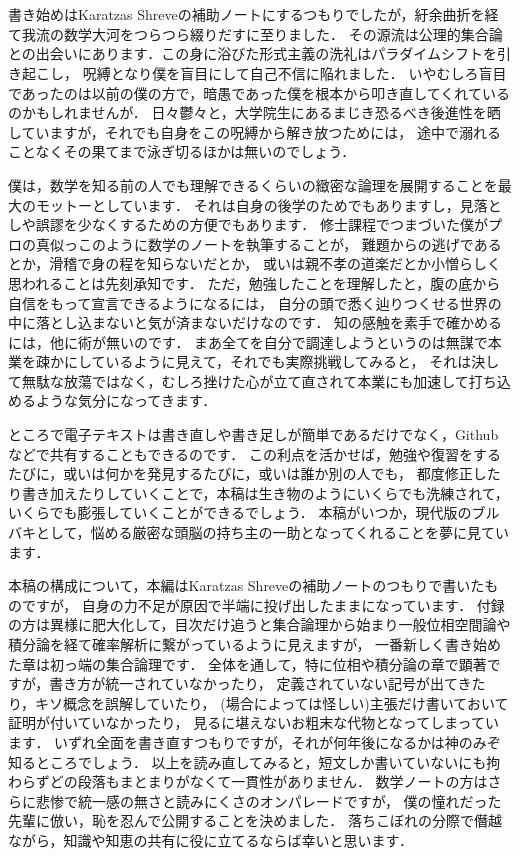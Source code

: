 \chapter*{}
書き始めはKaratzas Shreveの補助ノートにするつもりでしたが，紆余曲折を経て我流の数学大河をつらつら綴りだすに至りました．
その源流は公理的集合論との出会いにあります．この身に浴びた形式主義の洗礼はパラダイムシフトを引き起こし，
呪縛となり僕を盲目にして自己不信に陥れました．
いやむしろ盲目であったのは以前の僕の方で，暗愚であった僕を根本から叩き直してくれているのかもしれませんが．
日々鬱々と，大学院生にあるまじき恐るべき後進性を晒していますが，それでも自身をこの呪縛から解き放つためには，
途中で溺れることなくその果てまで泳ぎ切るほかは無いのでしょう．

僕は，数学を知る前の人でも理解できるくらいの緻密な論理を展開することを最大のモットーとしています．
それは自身の後学のためでもありますし，見落としや誤謬を少なくするための方便でもあります．
修士課程でつまづいた僕がプロの真似っこのように数学のノートを執筆することが，
難題からの逃げであるとか，滑稽で身の程を知らないだとか，
或いは親不孝の道楽だとか小憎らしく思われることは先刻承知です．
ただ，勉強したことを理解したと，腹の底から自信をもって宣言できるようになるには，
自分の頭で悉く辿りつくせる世界の中に落とし込まないと気が済まないだけなのです．
知の感触を素手で確かめるには，他に術が無いのです．
まあ全てを自分で調達しようというのは無謀で本業を疎かにしているように見えて，それでも実際挑戦してみると，
それは決して無駄な放蕩ではなく，むしろ挫けた心が立て直されて本業にも加速して打ち込めるような気分になってきます．

ところで電子テキストは書き直しや書き足しが簡単であるだけでなく，Githubなどで共有することもできるのです．
この利点を活かせば，勉強や復習をするたびに，或いは何かを発見するたびに，或いは誰か別の人でも，
都度修正したり書き加えたりしていくことで，本稿は生き物のようにいくらでも洗練されて，
いくらでも膨張していくことができるでしょう．
本稿がいつか，現代版のブルバキとして，悩める厳密な頭脳の持ち主の一助となってくれることを夢に見ています．

本稿の構成について，本編はKaratzas Shreveの補助ノートのつもりで書いたものですが，
自身の力不足が原因で半端に投げ出したままになっています．
付録の方は異様に肥大化して，目次だけ追うと集合論理から始まり一般位相空間論や積分論を経て確率解析に繋がっているように見えますが，
一番新しく書き始めた章は初っ端の集合論理です．
全体を通して，特に位相や積分論の章で顕著ですが，書き方が統一されていなかったり，
定義されていない記号が出てきたり，キソ概念を誤解していたり，
(場合によっては怪しい)主張だけ書いておいて証明が付いていなかったり，
見るに堪えないお粗末な代物となってしまっています．
いずれ全面を書き直すつもりですが，それが何年後になるかは神のみぞ知るところでしょう．
以上を読み直してみると，短文しか書いていないにも拘わらずどの段落もまとまりがなくて一貫性がありません．
数学ノートの方はさらに悲惨で統一感の無さと読みにくさのオンパレードですが，
僕の憧れだった先輩に倣い，恥を忍んで公開することを決めました．
落ちこぼれの分際で僭越ながら，知識や知恵の共有に役に立てるならば幸いと思います．
\\
\\
\\

